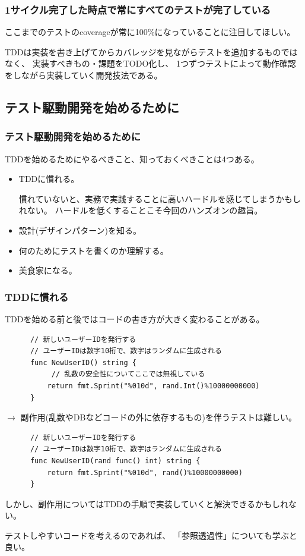 \documentclass[aspectratio=169]{beamer}
\begin{document}
\begin{frame}\frametitle{1サイクル完了した時点で常にすべてのテストが完了している}
  ここまでのテストのcoverageが常に100\%になっていることに注目してほしい。

  TDDは実装を書き上げてからカバレッジを見ながらテストを追加するものではなく、
  \color{blue}
  実装すべきもの・課題をTODO化し、
  1つずつテストによって動作確認をしながら実装していく開発技法である。
\end{frame}

\subsection{テスト駆動開発を始めるために}
\begin{frame}\frametitle{テスト駆動開発を始めるために}
  TDDを始めるためにやるべきこと、知っておくべきことは4つある。
  \begin{itemize}
    \item {\color{blue} TDDに慣れる。}

      慣れていないと、実務で実践することに高いハードルを感じてしまうかもしれない。
      ハードルを低くすることこそ今回のハンズオンの趣旨。
    \item {\color{blue} 設計(デザインパターン)を知る。}
    \item {\color{blue} 何のためにテストを書くのか理解する。}
    \item {\color{blue} 美食家になる。}
  \end{itemize}
\end{frame}

\begin{frame}[fragile]\frametitle{TDDに慣れる}
  TDDを始める前と後ではコードの書き方が大きく変わることがある。
  {
    \scriptsize
    \begin{verbatim}
      // 新しいユーザーIDを発行する
      // ユーザーIDは数字10桁で、数字はランダムに生成される
      func NewUserID() string {
           // 乱数の安全性についてここでは無視している
          return fmt.Sprint("%010d", rand.Int()%10000000000)
      }
    \end{verbatim}
  }
  $\rightarrow$
  副作用(乱数やDBなどコードの外に依存するもの)を伴うテストは難しい。
  {
    \scriptsize
    \begin{verbatim}
      // 新しいユーザーIDを発行する
      // ユーザーIDは数字10桁で、数字はランダムに生成される
      func NewUserID(rand func() int) string {
          return fmt.Sprint("%010d", rand()%10000000000)
      }
    \end{verbatim}
  }
  しかし、副作用についてはTDDの手順で実装していくと解決できるかもしれない。

  \color{gray}\small
  テストしやすいコードを考えるのであれば、
  「参照透過性」についても学ぶと良い。
\end{frame}
\end{document}
